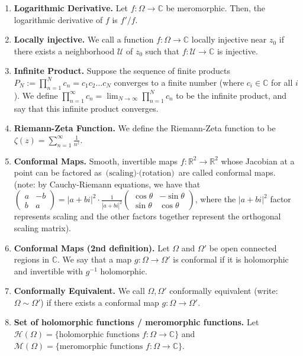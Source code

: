 \documentclass[12pt]{article}
\theoremstyle{definition}
\theoremstyle{named}
\begin{document}
{\begin{multicols}{2}
\begin{spacing}{1.01}
\begin{enumerate}
    \item \textbf{Logarithmic Derivative. } Let $f: \Omega \to \mathbb{C}$ be meromorphic. Then, the logarithmic derivative of $f$ is $f'/f$. 
    \item \textbf{Locally injective. } We call a function $f: \Omega \to \mathbb{C}$ locally injective near $z_0$ if there exists a neighborhood $\mathcal{U}$ of $z_0$ such that $f: \mathcal{U} \to \mathbb{C}$ is injective. 
    \item \textbf{Infinite Product. } Suppose the sequence of finite products $P_N := \prod_{n=1}^{N} c_n = c_1 c_2 \dots c_N$ converges to a finite number (where $c_i \in \mathbb{C}$ for all $i$). We define $\prod_{n=1}^{\infty} c_n = \lim_{N \to \infty} \prod_{n=1}^{N} c_n$ to be the infinite product, and say that this infinite product converges. 
    \item \textbf{Riemann-Zeta Function. } We define the Riemann-Zeta function to be $\zeta(z) = \sum_{n=1}^{\infty} \frac{1}{n^z}$. 
    \item \textbf{Conformal Maps. } Smooth, invertible maps $f: \mathbb{R}^2 \to \mathbb{R}^2$ whose Jacobian at a point can be factored as $\textrm{(scaling)} \cdot \textrm{(rotation)}$ are called conformal maps. (note: by Cauchy-Riemann equations, we have that $\begin{pmatrix}
        a & -b \\
        b & a
    \end{pmatrix} = |a+bi|^2 \cdot \frac{1}{|a+bi|^2} \begin{pmatrix}
        \cos\theta & -\sin\theta \\
        \sin\theta & \cos\theta
    \end{pmatrix}$, where the $|a+bi|^2$ factor represents scaling and the other factors together represent the orthogonal scaling matrix). 
    \item \textbf{Conformal Maps (2nd definition). } Let $\Omega$ and $\Omega'$ be open connected regions in $\mathbb{C}$. We say that a map $g: \Omega \to \Omega'$ is conformal if it is holomorphic and invertible with $g^{-1}$ holomorphic. 
    \item \textbf{Conformally Equivalent. } We call $\Omega,\Omega'$ conformally equivalent (write: $\Omega \sim \Omega'$) if there exists a conformal map $g: \Omega \to \Omega'$. 
    \item \textbf{Set of holomorphic functions / meromorphic functions. } Let $\mathcal{H}(\Omega) = \{\textrm{holomorphic functions $f: \Omega \to \mathbb{C}$}\}$ and $\mathcal{M}(\Omega) = \{\textrm{meromorphic functions $f: \Omega \to \mathbb{C}$}\}$.

\end{enumerate}
\end{spacing}
\end{multicols}}
\end{document}
